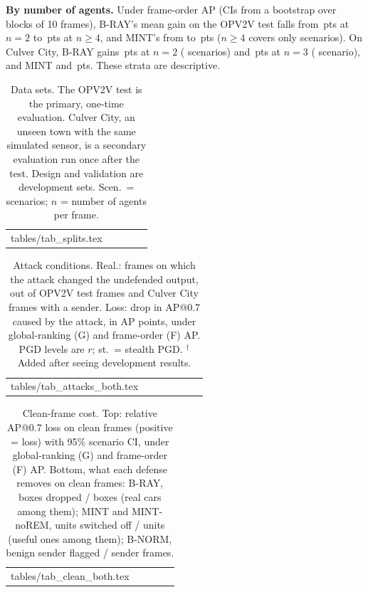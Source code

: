 \documentclass[conference]{IEEEtran}
\makeatletter
\newcommand{\mint}{MINT}
\newcommand{\pts}{\,pts}
\newcommand{\tabin}[1]{\@@input #1 }
\makeatother
\begin{document}
\textbf{By number of agents.} Under frame-order AP (CIs from a bootstrap over blocks of 10 frames), B-RAY's mean gain on the OPV2V test falls from
\ByNTwoBRAY\pts{} \ByNTwoBRAYCI{} at $n=2$ to \ByNFourPlusBRAY\pts{} \ByNFourPlusBRAYCI{} at $n\ge 4$, and
\mint's from \ByNTwoMINT{} to \ByNFourPlusMINT\pts{} ($n\ge 4$ covers only \ByNFourPlusScen{} scenarios). On
Culver City, B-RAY gains \CulByNTwoBRAY\pts{} \CulByNTwoBRAYCI{} at $n=2$ (\CulByNTwoScen{} scenarios) and
\CulByNThreeBRAY\pts{} \CulByNThreeBRAYCI{} at $n=3$ (\CulByNThreeScen{} scenario), and \mint{}
\CulByNTwoMINT{} and \CulByNThreeMINT\pts. These strata are descriptive.

\begin{table}[!htb]
\caption{Data sets. The OPV2V test is the primary, one-time evaluation. Culver City, an unseen town with the
same simulated sensor, is a secondary evaluation run once after the test. Design and validation are development sets.
Scen.\ = scenarios; $n$ = number of agents per frame.}
\label{tab:splits}
\centering
\footnotesize
\setlength{\tabcolsep}{4pt}
\begin{tabular}{@{}lrrcp{4.05cm}@{}}
\toprule
\tabin{tables/tab_splits.tex}
\bottomrule
\end{tabular}
\end{table}

\begin{table}[!htb]
\caption{Attack conditions. Real.: frames on which the attack changed the undefended output, out of
\WithSenderSpoofFeat{} OPV2V test frames and \CulWithSender{} Culver City frames with a sender. Loss: drop in
AP@0.7 caused by the attack, in AP points, under global-ranking (G) and frame-order (F) AP. PGD levels are $r$;
st.\ = stealth PGD. $^\dagger$Added after seeing development results.}
\label{tab:attacks}
\centering
\footnotesize
\setlength{\tabcolsep}{2.6pt}
\begin{tabular}{@{}lrrrrrr@{}}
\toprule
\tabin{tables/tab_attacks_both.tex}
\bottomrule
\end{tabular}
\end{table}

\begin{table}[!htb]
\caption{Clean-frame cost. Top: relative AP@0.7 loss on clean frames (positive = loss) with 95\% scenario CI,
under global-ranking (G) and frame-order (F) AP. Bottom, what each defense removes on clean frames: B-RAY, boxes
dropped / boxes (real cars among them); \mint{} and \mint-noREM, units switched off / units (useful ones among
them); B-NORM, benign sender flagged / sender frames.}
\label{tab:clean}
\centering
\scriptsize
\setlength{\tabcolsep}{3.5pt}
\begin{tabular}{@{}lcccc@{}}
\toprule
\tabin{tables/tab_clean_both.tex}
\bottomrule
\end{tabular}
\end{table}
\end{document}
